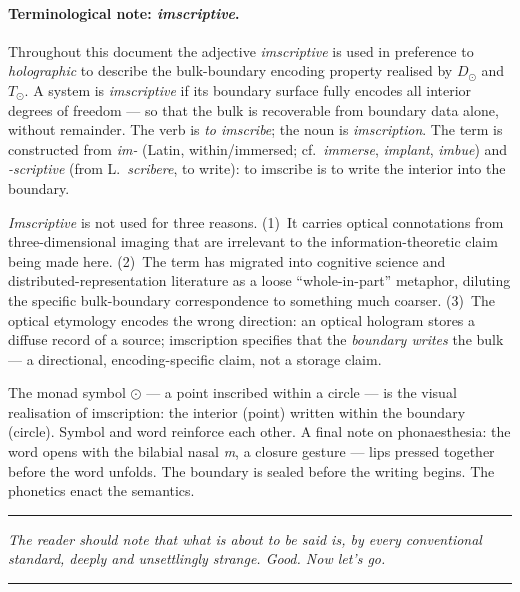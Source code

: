 \documentclass[12pt,a4paper]{article}
\begin{document}
\paragraph*{Terminological note: \emph{imscriptive}.}
Throughout this document the adjective \emph{imscriptive} is used in preference to \emph{holographic} to describe the bulk-boundary encoding property realised by $D_\odot$ and $T_\odot$. A system is \emph{imscriptive} if its boundary surface fully encodes all interior degrees of freedom --- so that the bulk is recoverable from boundary data alone, without remainder. The verb is \emph{to imscribe}; the noun is \emph{imscription}. The term is constructed from \emph{im-} (Latin, within/immersed; cf.\ \emph{immerse}, \emph{implant}, \emph{imbue}) and \emph{-scriptive} (from L.\ \emph{scribere}, to write): to imscribe is to write the interior into the boundary.

\emph{Imscriptive} is not used for three reasons. (1)~It carries optical connotations from three-dimensional imaging that are irrelevant to the information-theoretic claim being made here. (2)~The term has migrated into cognitive science and distributed-representation literature as a loose ``whole-in-part'' metaphor, diluting the specific bulk-boundary correspondence to something much coarser. (3)~The optical etymology encodes the wrong direction: an optical hologram stores a diffuse record of a source; imscription specifies that the \emph{boundary writes} the bulk --- a directional, encoding-specific claim, not a storage claim.

The monad symbol $\odot$ --- a point inscribed within a circle --- is the visual realisation of imscription: the interior (point) written within the boundary (circle). Symbol and word reinforce each other. A final note on phonaesthesia: the word opens with the bilabial nasal \emph{m}, a closure gesture --- lips pressed together before the word unfolds. The boundary is sealed before the writing begins. The phonetics enact the semantics.

\begin{center}
\rule{0.5\textwidth}{0.4pt}
\end{center}

\begin{center}
\emph{The reader should note that what is about to be said is, by every conventional standard, deeply and unsettlingly strange. Good. Now let's go.}
\end{center}

\begin{center}
\rule{0.5\textwidth}{0.4pt}
\end{center}
\end{document}
